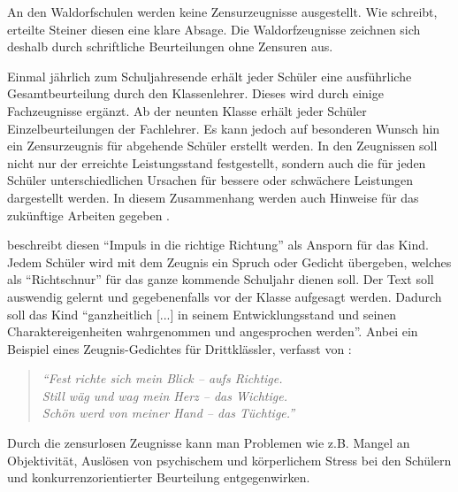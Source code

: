 An den Waldorfschulen werden keine Zensurzeugnisse ausgestellt. Wie \cite{geuenich09} schreibt, erteilte Steiner diesen eine klare Absage. Die Waldorfzeugnisse zeichnen sich deshalb durch schriftliche Beurteilungen ohne Zensuren aus.

Einmal jährlich zum Schuljahresende erhält jeder Schüler eine ausführliche Gesamtbeurteilung durch den Klassenlehrer. Dieses wird durch einige Fachzeugnisse ergänzt. Ab der neunten Klasse erhält jeder Schüler Einzelbeurteilungen der Fachlehrer. Es kann jedoch auf besonderen Wunsch hin ein Zensurzeugnis für abgehende Schüler erstellt werden. In den Zeugnissen soll nicht nur der erreichte Leistungsstand festgestellt, sondern auch die für jeden Schüler unterschiedlichen Ursachen für bessere oder schwächere Leistungen dargestellt werden. In diesem Zusammenhang werden auch Hinweise für das zukünftige Arbeiten gegeben \citep[vgl.][S. 51]{kiersch07}.

 \citet[S. 102]{geuenich09} beschreibt diesen \enquote{Impuls in die richtige Richtung} als Ansporn für das Kind. Jedem Schüler wird mit dem Zeugnis ein Spruch oder Gedicht übergeben, welches als \enquote{Richtschnur} für das ganze kommende Schuljahr dienen soll. Der Text soll auswendig gelernt und gegebenenfalls vor der Klasse aufgesagt werden. Dadurch soll das Kind \enquote{ganzheitlich [...] in seinem Entwicklungsstand und seinen Charaktereigenheiten wahrgenommen und angesprochen werden}. Anbei ein Beispiel eines Zeugnis-Gedichtes für Drittklässler, verfasst von \cite{kullak13}:

 \begin{quotation}
			\emph{\enquote{Fest richte sich mein Blick – aufs Richtige.\\
							Still wäg und wag mein Herz – das Wichtige.\\
							Schön werd von meiner Hand – das Tüchtige.}}
\end{quotation}

Durch die zensurlosen Zeugnisse kann man Problemen wie z.B. Mangel an Objektivität, Auslösen von psychischem und körperlichem Stress bei den Schülern und konkurrenzorientierter Beurteilung entgegenwirken. 



 








